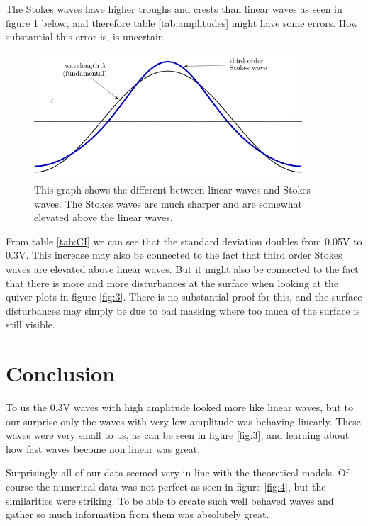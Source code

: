 \documentclass[english,a4paper,12pt]{article}
\begin{document}
The Stokes waves have higher troughs and crests than linear waves as seen in figure \ref{fig:stokes} below, and therefore table \ref{tab:amplitudes} might have some errors. How substantial this error is, is uncertain.

\begin{figure}[H]
    \centering
    \includegraphics[width=100mm]{stokes1.png}
    \caption{This graph shows the different between linear waves and Stokes waves. The Stokes waves are much sharper and are somewhat elevated above the linear waves.}
    \label{fig:stokes}
\end{figure}

From table \ref{tab:CI} we can see that the standard deviation doubles from 0.05V to 0.3V. This increase may also be connected to the fact that third order Stokes waves are elevated above linear waves. But it might also be connected to the fact that there is more and more disturbances at the surface when looking at the quiver plots in figure \ref{fig:3}. There is no substantial proof for this, and the surface disturbances may simply be due to bad masking where too much of the surface is still visible. \\ \bigskip

\section*{Conclusion}
To us the 0.3V waves with high amplitude looked more like linear waves, but to our surprise only the waves with very low amplitude was behaving linearly. These waves were very small to us, as can be seen in figure \ref{fig:3}, and learning about how fast waves become non linear was great. \\ \bigskip

Surprisingly all of our data seemed very in line with the theoretical models. Of course the numerical data was not perfect as seen in figure \ref{fig:4}, but the similarities were striking. To be able to create such well behaved waves and gather so much information from them was absolutely great. \\ \bigskip
\end{document}
